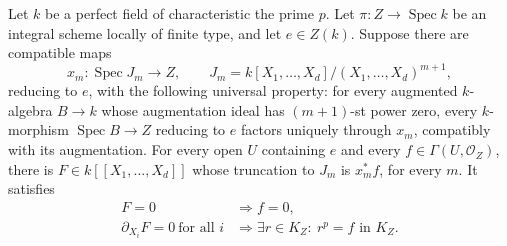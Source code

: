 \begin{srlemma}\label{lem:faithful-universal-jets-taylor}
Let \(k\) be a perfect field of characteristic the prime \(p\).
Let \(\pi:Z\to\operatorname{Spec}k\) be an integral scheme
locally of finite type, and let \(e\in Z(k)\).
Suppose there are compatible maps
\[
 x_m:\operatorname{Spec}J_m\longrightarrow Z,\qquad
 J_m=k[X_1,\ldots,X_d]/(X_1,\ldots,X_d)^{m+1},
\]
reducing to \(e\), with the following universal property:
for every augmented \(k\)-algebra \(B\to k\) whose
augmentation ideal has \((m+1)\)-st power zero,
every \(k\)-morphism \(\operatorname{Spec}B\to Z\)
reducing to \(e\) factors uniquely through \(x_m\),
compatibly with its augmentation.
For every open \(U\) containing \(e\) and every
\(f\in\Gamma(U,\mathcal O_Z)\), there is
\(F\in k[[X_1,\ldots,X_d]]\) whose truncation to \(J_m\)
is \(x_m^*f\), for every \(m\).
It satisfies
\[
 \begin{split}
 F=0&\Longrightarrow f=0,\\
 \partial_{X_i}F=0\ \text{for all }i
   &\Longrightarrow
       \exists r\in K_Z:\ r^p=f\text{ in }K_Z .
 \end{split}
 \tag{FT4}\label{eq:faithful-Taylor-function-field}
\]
\end{srlemma}
